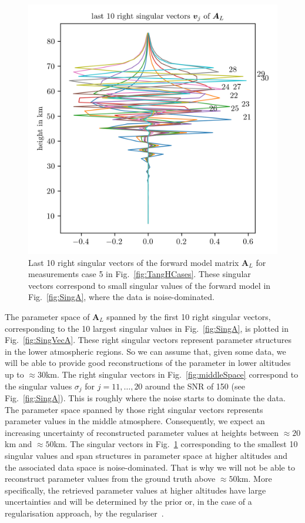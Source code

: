 \begin{figure}[ht!]
	\centering
	\includegraphics{NullVecA.png}
	\caption[Last 10 right singular vectors of forward model.]{Last 10 right singular vectors of the forward model matrix $\bm{A}_L$ for measurements case 5 in Fig.~\ref{fig:TangHCases}. These singular vectors correspond to small singular values of the forward model in Fig.~\ref{fig:SingA}, where the data is noise-dominated.}
	\label{fig:nullSpace}
\end{figure}
The parameter space of $\bm{A}_L$ spanned by the first 10 right singular vectors, corresponding to the 10 largest singular values in Fig.~\ref{fig:SingA}, is plotted in Fig.~\ref{fig:SingVecA}.
These right singular vectors represent parameter structures in the lower atmospheric regions.
So we can assume that, given some data, we will be able to provide good reconstructions of the parameter in lower altitudes up to $\approx30$km.
The right singular vectors in Fig.~\ref{fig:middleSpace} correspond to the singular values $\sigma_j$ for $j = 11, \dots, 20$ around the SNR of 150 (see Fig.~\ref{fig:SingA}).
This is roughly where the noise starts to dominate the data.
The parameter space spanned by those right singular vectors represents parameter values in the middle atmosphere.
Consequently, we expect an increasing uncertainty of reconstructed parameter values at heights between $\approx20$km and $\approx50$km.
The singular vectors in Fig.~\ref{fig:nullSpace} corresponding to the smallest 10 singular values and span structures in parameter space at higher altitudes and the associated data space is noise-dominated.
That is why we will not be able to reconstruct parameter values from the ground truth above $\approx50$km.
More specifically, the retrieved parameter values at higher altitudes have large uncertainties and will be determined by the prior or, in the case of a regularisation approach, by the regulariser~\cite{tan2016LecNot}.

